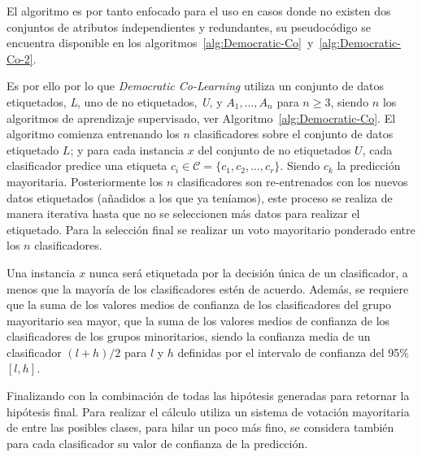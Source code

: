 El algoritmo es por tanto enfocado para el uso en casos donde no existen dos conjuntos de atributos independientes y redundantes, su pseudocódigo se encuentra disponible en los algoritmos~\ref{alg:Democratic-Co}~y~\ref{alg:Democratic-Co-2}.

Es por ello por lo que \textit{Democratic Co-Learning} utiliza un conjunto de datos etiquetados, \textit{L}, uno de no etiquetados, \textit{U}, y $A_1,\dots ,A_n$ para $n \geq 3$, siendo $n$ los algoritmos de aprendizaje supervisado, ver Algoritmo~\ref{alg:Democratic-Co}. El algoritmo comienza entrenando los $n$ clasificadores sobre el conjunto de datos etiquetado $L$; y para cada instancia $x$ del conjunto de no etiquetados $U$, cada clasificador predice una etiqueta $c_i \in \mathcal{C} = \lbrace c_1, c_2, \dots , c_r\rbrace$. Siendo $c_k$ la predicción mayoritaria. Posteriormente los $n$ clasificadores son re-entrenados con los nuevos datos etiquetados (añadidos a los que ya teníamos), este proceso se realiza de manera iterativa hasta que no se seleccionen más datos para realizar el etiquetado. Para la selección final se realizar un voto mayoritario ponderado entre los $n$ clasificadores. 

Una instancia $x$ nunca será etiquetada por la decisión única de un clasificador, a menos que la mayoría de los clasificadores estén de acuerdo. Además, se requiere que la suma de los valores medios de confianza de los clasificadores del grupo mayoritario sea mayor, que la suma de los valores medios de confianza de los clasificadores de los grupos minoritarios, siendo la confianza media de un clasificador $ (l + h)/2
$ para $l$ y $h$ definidas por el intervalo de confianza del 95\% $\left[l,h\right]$.

Finalizando con la combinación de todas las hipótesis generadas para retornar la hipótesis final. Para realizar el cálculo utiliza un sistema de votación mayoritaria de entre las posibles clases, para hilar un poco más fino, se considera también para cada clasificador su valor de confianza de la predicción. 

